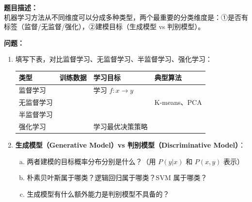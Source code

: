 \documentclass[a4paper,11pt]{ctexart}
\begin{document}
\begin{problembox}
    \textbf{题目描述：}\\
    机器学习方法从不同维度可以分成多种类型，两个最重要的分类维度是：①是否有标签（监督/无监督/强化），②建模目标（生成模型 vs 判别模型）。

    \vspace{0.3cm}
    \textbf{问题：}
    \begin{enumerate}[(1)]
        \item 填写下表，对比监督学习、无监督学习、半监督学习、强化学习：

        \begin{center}
        \begin{tabular}{p{2.8cm} p{3cm} p{3cm} p{3.5cm}}
            \toprule
            类型 & 训练数据 & 学习目标 & 典型算法 \\
            \midrule
            监督学习 & \underline{\hspace{2.5cm}} & 学习 $f: x\to y$ & \underline{\hspace{3cm}} \\[1.2em]
            无监督学习 & \underline{\hspace{2.5cm}} & \underline{\hspace{2.5cm}} & K-means、PCA \\[1.2em]
            半监督学习 & \underline{\hspace{2.5cm}} & \underline{\hspace{2.5cm}} & \underline{\hspace{3cm}} \\[1.2em]
            强化学习 & \underline{\hspace{2.5cm}} & 学习最优决策策略 & \underline{\hspace{3cm}} \\
            \bottomrule
        \end{tabular}
        \end{center}

        \item \textbf{生成模型（Generative Model）vs 判别模型（Discriminative Model）}：
        \begin{enumerate}[a.]
            \item 两者建模的目标概率分布分别是什么？（用 $P(y|x)$ 和 $P(x,y)$ 表示）
            \item 朴素贝叶斯属于哪类？逻辑回归属于哪类？SVM 属于哪类？
            \item 生成模型有什么额外能力是判别模型不具备的？
        \end{enumerate}


\end{enumerate}
\end{problembox}
\end{document}

